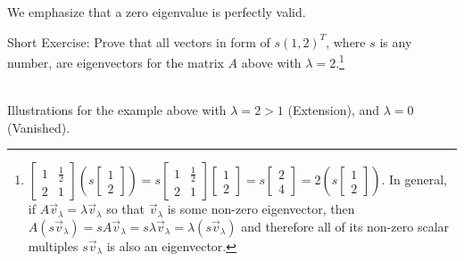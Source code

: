We emphasize that a zero eigenvalue is perfectly valid. \par
Short Exercise: Prove that all vectors in form of $s(1,2)^T$, where $s$ is any number, are eigenvectors for the matrix $A$ above with $\lambda = 2$.\footnote{
$
\begin{bmatrix}
1 & \frac{1}{2} \\
2 & 1
\end{bmatrix}
\left(s
\begin{bmatrix}
1 \\
2 
\end{bmatrix}\right)
=
s\begin{bmatrix}
1 & \frac{1}{2} \\
2 & 1
\end{bmatrix}
\begin{bmatrix}
1 \\
2 
\end{bmatrix}
=
s
\begin{bmatrix}
2 \\
4
\end{bmatrix}
=
2\left(s
\begin{bmatrix}
1 \\
2 
\end{bmatrix}\right)
$. In general, if $A\vec{v}_\lambda = \lambda\vec{v}_\lambda$ so that $\vec{v}_\lambda$ is some non-zero eigenvector, then $A(s\vec{v}_\lambda) = sA\vec{v}_\lambda = s\lambda\vec{v}_\lambda = \lambda(s\vec{v}_\lambda)$ and therefore all of its non-zero scalar multiples $s\vec{v}_\lambda$ is also an eigenvector.}
\begin{center}
\\
Illustrations for the example above with $\lambda = 2 > 1$ (Extension), and $\lambda = 0$ (Vanished).
\end{center}
